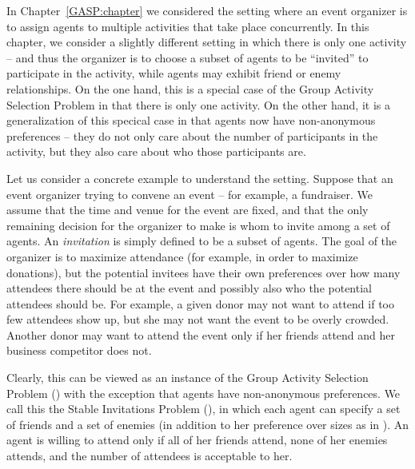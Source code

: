
\label{SIP:chapter}

In Chapter~\ref{GASP:chapter} we considered the setting where an event organizer is to assign agents to multiple activities that take place concurrently. In this chapter, we consider a slightly different setting in which there is only one activity -- and thus the organizer is to choose a subset of agents to be ``invited'' to participate in the activity, while agents may exhibit friend or enemy relationships. 
On the one hand, this is a special case of the Group Activity Selection Problem in that there is only one activity. On the other hand, it is a generalization of this specical case in that agents now have non-anonymous preferences -- they do not only care about the number of participants in the activity, but they also care about who those participants are.

Let us consider a concrete example to understand the setting. Suppose that  an event organizer trying to convene an event -- for example, a fundraiser. We assume that the time and venue for the event are fixed,
and that the only remaining decision for the organizer to make is whom
to invite among a set of agents.
An \emph{invitation} is simply defined to be a subset of agents.
The goal of the organizer is to maximize attendance (for example, 
in order to maximize donations), but the potential invitees have 
their own preferences over how many attendees there should be at the event 
and possibly also who the potential attendees should be.
For example, a given donor may not want to attend if too few attendees 
show up, but she may not want the event to be overly crowded. 
Another donor may want to attend the event only
if her friends attend and her business competitor does not.

Clearly, this can be viewed as an instance of the Group Activity Selection Problem (\GASP) with the exception that agents have non-anonymous preferences. 
We call this the Stable Invitations Problem (\SIP), in which each agent 
can specify a set of friends and a set of enemies (in addition to her preference over sizes as in \GASP).
An agent is willing to attend only if all of her friends attend, none of her enemies attends, and  the number of attendees is acceptable to her. 

